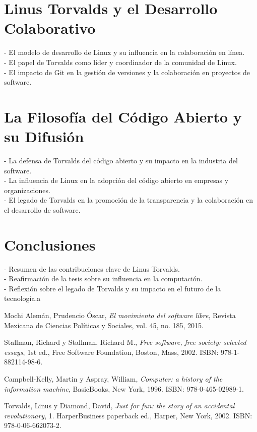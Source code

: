 \documentclass[a4paper,12pt]{article}
\begin{document}
\section{Linus Torvalds y el Desarrollo Colaborativo} 
- El modelo de desarrollo
de Linux y su influencia en la colaboración en línea.\\ 
- El papel de Torvalds
como líder y coordinador de la comunidad de Linux.\\ 
- El impacto de Git en la
gestión de versiones y la colaboración en proyectos de software.

\section{La Filosofía del Código Abierto y su Difusión} 
- La defensa de Torvalds
del código abierto y su impacto en la industria del software.\\ 
- La influencia
de Linux en la adopción del código abierto en empresas y organizaciones.\\ 
- El
legado de Torvalds en la promoción de la transparencia y la colaboración en el
desarrollo de software.

\section{Conclusiones} 
- Resumen de las contribuciones clave de Linus
Torvalds.\\ 
- Reafirmación de la tesis sobre su influencia en la computación.\\

- Reflexión sobre el legado de Torvalds y su impacto en el futuro de la
tecnología.a
\newpage

\begin{thebibliography}{9}

Mochi Alemán, Prudencio Óscar, \textit{El movimiento del software libre}, Revista Mexicana de Ciencias Políticas y Sociales, vol. 45, no. 185, 2015.

Stallman, Richard y Stallman, Richard M., \textit{Free software, free society: selected essays}, 1st ed., Free Software Foundation, Boston, Mass, 2002. ISBN: 978-1-882114-98-6.

Campbell-Kelly, Martin y Aspray, William, \textit{Computer: a history of the information machine}, BasicBooks, New York, 1996. ISBN: 978-0-465-02989-1.

Torvalds, Linus y Diamond, David, \textit{Just for fun: the story of an accidental revolutionary}, 1. HarperBusiness paperback ed., Harper, New York, 2002. ISBN: 978-0-06-662073-2.

\end{thebibliography}
\end{document}
